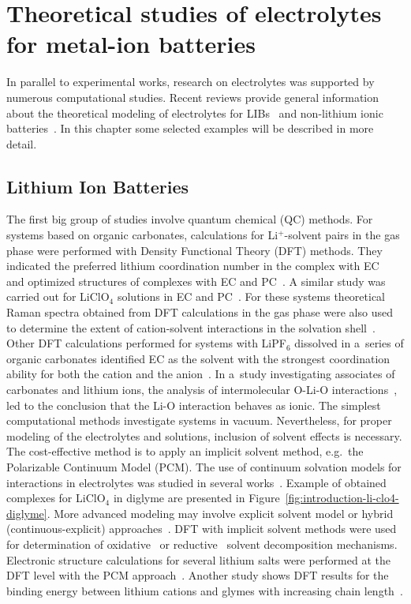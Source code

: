\section{Theoretical studies of electrolytes for metal-ion batteries}

In parallel to experimental works, research on electrolytes was supported by numerous computational studies. Recent reviews provide general information about the theoretical modeling of electrolytes for LIBs~\cite{li-modeling-review} and non-lithium ionic batteries~\cite{na-modeling-review}. In this chapter some selected examples will be described in more detail.

\subsection{Lithium Ion Batteries}

The first big group of studies involve quantum chemical (QC) methods. For systems based on organic carbonates, calculations for Li$^{+}$-solvent pairs in the gas phase were performed with Density Functional Theory (DFT) methods. They indicated the preferred lithium coordination number in the complex with EC~\cite{li-ec-dft,li-diffusion-dft-aimd} and optimized structures of complexes with EC and PC~\cite{li-ec-pc-dft}. A similar study was carried out for LiClO$_4$ solutions in EC and PC~\cite{li-dft-clo4}. For these systems theoretical Raman spectra obtained from DFT calculations in the gas phase were also used to determine the extent of cation-solvent interactions in the solvation shell~\cite{li-raman-ec-dft}. Other DFT calculations performed for systems with LiPF$_6$ dissolved in a~series of organic carbonates identified EC as the solvent with the strongest coordination ability for both the cation and the anion~\cite{li-pf6-dft}. In a~study investigating associates of carbonates and lithium ions, the analysis of intermolecular O-Li-O interactions~\cite{li-dft-associations}, led to the conclusion that the Li-O interaction behaves as ionic. The simplest computational methods investigate systems in vacuum. Nevertheless, for proper modeling of the electrolytes and solutions, inclusion of solvent effects is necessary. The cost-effective method is to apply an implicit solvent method, e.g.~the Polarizable Continuum Model (PCM). The use of continuum solvation models for interactions in electrolytes was studied in several works~\cite{pcm-1,lib-solvent-effects,pcm-2}. Example of obtained complexes for LiClO$_4$ in diglyme are presented in Figure~\ref{fig:introduction-li-clo4-diglyme}. More advanced modeling may involve explicit solvent model or hybrid (continuous-explicit) approaches~\cite{pcm-3,pcm-4}. DFT with implicit solvent methods were used for determination of oxidative~\cite{li-dft-oxidative} or reductive~\cite{li-dft-reductive,li-dft-md-reductive} solvent decomposition mechanisms. Electronic structure calculations for several lithium salts were performed at the DFT level with the PCM approach~\cite{lib-solvent-effects}. Another study shows DFT results for the binding energy between lithium cations and glymes with increasing chain length~\cite{li-glyme-dft}.

